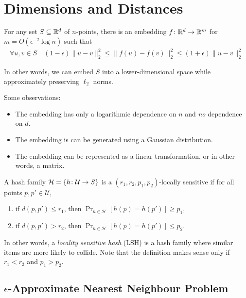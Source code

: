 \documentclass{article}
\begin{document}
\pagebreak

\section{Dimensions and Distances}

\begin{lemma}
For any set $S \subseteq \mathbb{R}^d$ of $n$-points, there is an embedding $f \colon \mathbb{R}^d \to \mathbb{R}^m$ for $m = O(\epsilon^{-2} \log n)$ such that
\begin{align}
  \forall u, v \in S \quad (1 - \epsilon) \|u - v\|_2^2 \le \|f(u) - f(v)\|_2^2 \le (1 + \epsilon) \|u - v\|_2^2
\end{align}
\end{lemma}
In other words, we can embed $S$ into a lower-dimensional space while approximately preserving $\ell_2$ norms.

Some observations:
\begin{itemize}
  \item The embedding has only a logarithmic dependence on $n$ and \emph{no} dependence on $d$.
  \item The embedding is can be generated using a Gaussian distribution.
  \item The embedding can be represented as a linear transformation, or in other words, a matrix.
\end{itemize}

\begin{definition}
  A hash family $\mathcal{H} = \{h \colon \mathcal{U} \to S\}$ is a $(r_1, r_2, p_1, p_2)$-locally sensitive if for all points $p, p' \in \mathcal{U}$,

  \begin{enumerate}
    \item if $d(p, p') \le r_1$, then $\Pr_{h \in \mathcal{H}}[h(p) = h(p')] \ge p_1$,
    \item if $d(p, p') > r_2$, then $\Pr_{h \in \mathcal{H}}[h(p) = h(p')] \le p_2$.
  \end{enumerate}

\end{definition}
In other words, a \emph{locality sensitive hash} (LSH) is a hash family where similar items are more likely to collide.
Note that the definition makes sense only if $r_1 < r_2$ and $p_1 > p_2$.

\subsection{$\epsilon$-Approximate Nearest Neighbour Problem}
\end{document}
